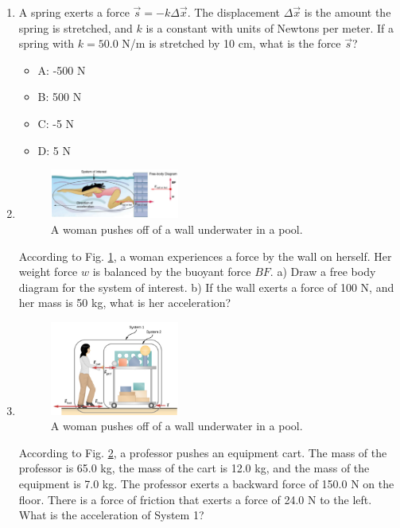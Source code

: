 \documentclass{article}
\begin{document}
\begin{enumerate}
\item A spring exerts a force $\vec{s} = -k \Delta\vec{x}$.  The displacement $\Delta\vec{x}$ is the amount the spring is stretched, and $k$ is a constant with units of Newtons per meter.  If a spring with $k = 50.0$ N/m is stretched by 10 cm, what is the force $\vec{s}$?
\begin{itemize}
\item A: -500 N
\item B: 500 N
\item C: -5 N
\item D: 5 N
\end{itemize}
\item 
\begin{figure}[ht]
\centering
\includegraphics[width=0.4\textwidth,trim=0cm 0cm 4.75cm 2cm,clip=true]{wall.png}
\caption{\label{fig:wall} A woman pushes off of a wall underwater in a pool.}
\end{figure}
According to Fig. \ref{fig:wall}, a woman experiences a force by the wall on herself.  Her weight force $w$ is balanced by the buoyant force $BF$.  a) Draw a free body diagram for the system of interest.  b) If the wall exerts a force of 100 N, and her mass is 50 kg, what is her acceleration?
\item 
\begin{figure}[ht]
\centering
\includegraphics[width=0.4\textwidth]{cart.png}
\caption{\label{fig:cart} A woman pushes off of a wall underwater in a pool.}
\end{figure}
According to Fig. \ref{fig:cart}, a professor pushes an equipment cart.  The mass of the professor is 65.0 kg, the mass of the cart is 12.0 kg, and the mass of the equipment is 7.0 kg.  The professor exerts a backward force of 150.0 N on the floor.  There is a force of friction that exerts a force of 24.0 N to the left.  What is the acceleration of System 1?
\end{enumerate}
\end{document}
